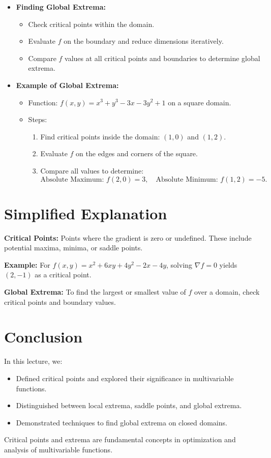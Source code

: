 \documentclass{article}
\begin{document}
\begin{itemize}
  \item \textbf{Finding Global Extrema:}
    \begin{itemize}
      \item Check critical points within the domain.
      \item Evaluate $f$ on the boundary and reduce dimensions iteratively.
      \item Compare $f$ values at all critical points and boundaries to determine global extrema.
    \end{itemize}

  \item \textbf{Example of Global Extrema:}
    \begin{itemize}
      \item Function: $f(x, y) = x^3 + y^3 - 3x - 3y^2 + 1$ on a square domain.
      \item Steps:
        \begin{enumerate}
          \item Find critical points inside the domain: $(1, 0)$ and $(1, 2)$.
          \item Evaluate $f$ on the edges and corners of the square.
          \item Compare all values to determine:
            \[
              \text{Absolute Maximum: } f(2, 0) = 3, \quad \text{Absolute Minimum: } f(1, 2) = -5.
            \]
        \end{enumerate}
    \end{itemize}
\end{itemize}

\section*{Simplified Explanation}

\textbf{Critical Points:}
Points where the gradient is zero or undefined. These include potential maxima, minima, or saddle points.

\textbf{Example:}
For $f(x, y) = x^2 + 6xy + 4y^2 - 2x - 4y$, solving $\nabla f = 0$ yields $(2, -1)$ as a critical point.

\textbf{Global Extrema:}
To find the largest or smallest value of $f$ over a domain, check critical points and boundary values.

\section*{Conclusion}

In this lecture, we:
\begin{itemize}
  \item Defined critical points and explored their significance in multivariable functions.
  \item Distinguished between local extrema, saddle points, and global extrema.
  \item Demonstrated techniques to find global extrema on closed domains.
\end{itemize}

Critical points and extrema are fundamental concepts in optimization and analysis of multivariable functions.
\end{document}
